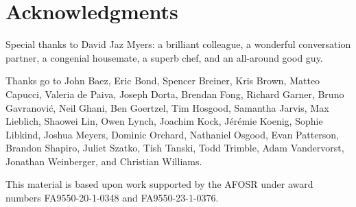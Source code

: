 \documentclass[Book-Poly]{subfiles}
\begin{document}
\section*{Acknowledgments}

Special thanks to David Jaz Myers: a brilliant colleague, a wonderful conversation partner, a congenial housemate, a superb chef, and an all-around good guy.

Thanks go to John Baez, Eric Bond, Spencer Breiner, Kris Brown, Matteo Capucci, Valeria de Paiva, Joseph Dorta, Brendan Fong, Richard Garner, Bruno Gavranovi\'c, Neil Ghani, Ben Goertzel, Tim Hosgood, Samantha Jarvis, Max Lieblich, Shaowei Lin, Owen Lynch, Joachim Kock, J\'er\'emie Koenig, Sophie Libkind, Joshua Meyers, Dominic Orchard, Nathaniel Osgood, Evan Patterson, Brandon Shapiro, Juliet Szatko, Tish Tanski, Todd Trimble, Adam Vandervorst, Jonathan Weinberger, and Christian Williams.

This material is based upon work supported by the AFOSR under award numbers FA9550-20-1-0348 and FA9550-23-1-0376.
\end{document}
